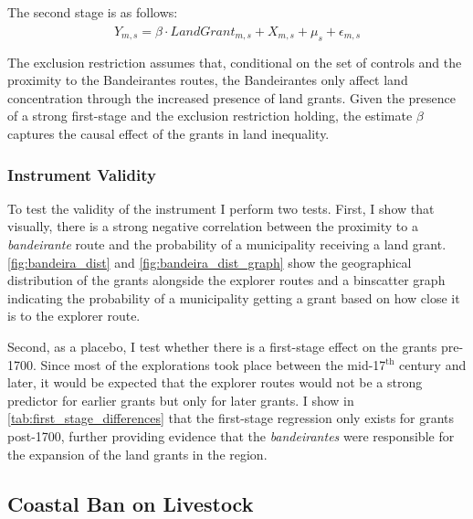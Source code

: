 \documentclass[11pt]{article}
\begin{document}
The second stage is as follows:
\begin{equation}
  \label{eqn:ivequation}
  Y_{m,s} = \beta \cdot \widehat{LandGrant}_{m,s} + X_{m,s} + \mu_s +  \epsilon_{m,s}
\end{equation}

The exclusion restriction assumes that, conditional on the set of controls and the proximity to the Bandeirantes routes, the Bandeirantes only affect land concentration through the increased presence of land grants.
Given the presence of a strong first-stage and the exclusion restriction holding, the estimate $\beta$ captures the causal effect of the grants in land inequality. 

\subsubsection{Instrument Validity}

To test the validity of the instrument I perform two tests.
First, I show that visually, there is a strong negative correlation between the proximity to a \textit{bandeirante} route and the probability of a municipality receiving a land grant. 
\autoref{fig:bandeira_dist} and \autoref{fig:bandeira_dist_graph} show the geographical distribution of the grants alongside the explorer routes and a binscatter graph indicating the probability of a municipality getting a grant based on how close it is to the explorer route. 

Second, as a placebo, I test whether there is a first-stage effect on the grants pre-1700. 
Since most of the explorations took place between the mid-17$^\text{th}$ century and later, it would be expected that the explorer routes would not be a strong predictor for earlier grants but only for later grants. 
I show in \autoref{tab:first_stage_differences} that the first-stage regression only exists for grants post-1700, further providing evidence that the \textit{bandeirantes} were responsible for the expansion of the land grants in the region. 

\subsection{Coastal Ban on Livestock}
\label{sec:coastal}
\end{document}
